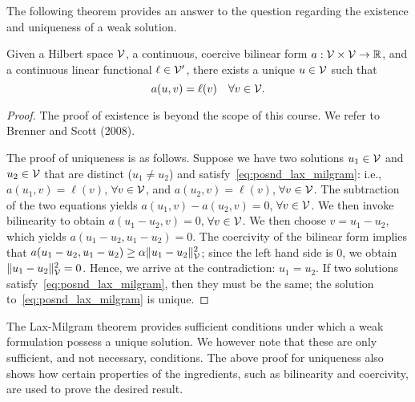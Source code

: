 The following theorem provides an answer to the question regarding the existence and uniqueness of a weak solution.
\begin{theorem}
  \label{thm:lax_milgram}
  Given a Hilbert space $\mathcal{V}$, a continuous, coercive bilinear form $a: \mathcal{V} \times \mathcal{V} \to \mathbb{R}$, and a continuous linear functional $\ell \in \mathcal{V}'$, there exists a unique $u \in \mathcal{V}$ such that
  \begin{equation}
    a(u,v) = \ell(v) \quad \forall v \in \mathcal{V}.
    \label{eq:posnd_lax_milgram}
  \end{equation}
  \begin{proof}
    The proof of existence is beyond the scope of this course.  We refer to Brenner and Scott (2008).

    The proof of uniqueness is as follows. Suppose we have two solutions $u_1 \in \mathcal{V}$ and $u_2 \in \mathcal{V}$ that are distinct ($u_1 \neq u_2$) and satisfy~\eqref{eq:posnd_lax_milgram}: i.e., $a(u_1,v) = \ell(v)$, $\forall v \in \mathcal{V}$, and $a(u_2,v) = \ell(v)$, $\forall v \in \mathcal{V}$. The subtraction of the two equations yields $a(u_1,v) - a(u_2,v) = 0$, $\forall v \in \mathcal{V}$.  We then invoke bilinearity to obtain $a(u_1 - u_2,v) = 0$, $\forall v \in \mathcal{V}$. We then choose $v = u_1 - u_2$, which yields $a(u_1 - u_2, u_1 - u_2) = 0$.  The coercivity of the bilinear form implies that $a(u_1 - u_2, u_1 - u_2) \geq \alpha \| u_1 - u_2 \|^2_{\mathcal{V}}$; since the left hand side is $0$, we obtain $\| u_1 - u_2 \|^2_{\mathcal{V}} = 0$.  Hence, we arrive at the contradiction: $u_1 = u_2$.  If two solutions satisfy~\eqref{eq:posnd_lax_milgram}, then they must be the same; the solution to~\eqref{eq:posnd_lax_milgram} is unique.
  \end{proof}
\end{theorem}
The Lax-Milgram theorem provides sufficient conditions under which a weak formulation possess a unique solution.  We however note that these are only sufficient, and not necessary, conditions.  The above proof for uniqueness also shows how certain properties of the ingredients, such as bilinearity and coercivity, are used to prove the desired result.


